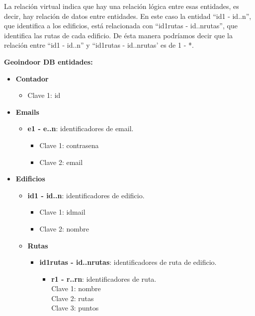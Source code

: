 La relación virtual indica que hay una relación lógica entre esas entidades, es decir, hay relación de datos entre entidades. En este caso la entidad ``id1 - id..n'', que identifica a los edificios, está relacionada con ``id1rutas - id..nrutas'', que identifica las rutas de cada edificio. De ésta manera podríamos decir que la relación entre ``id1 - id..n'' y ``id1rutas - id..nrutas' es de 1 - *.

\newpage
\textbf{ Geoindoor DB entidades:}
\begin{itemize}
	\item \textbf{Contador}
	\begin{itemize}
		\item Clave 1: id
	\end{itemize}
	\item \textbf{Emails}
	\begin{itemize}
		\item \textbf{e1 - e..n}: identificadores de email.
		\begin{itemize}
			\item Clave 1: contrasena
			\item Clave 2: email 
		\end{itemize}
	\end{itemize}
	\item \textbf{Edificios}
	\begin{itemize}
		\item \textbf{id1 - id..n}: identificadores de edificio.
		\begin{itemize}
			\item Clave 1: idmail 
			\item Clave 2: nombre
		\end{itemize}
		\item \textbf{Rutas}
		\begin{itemize}
			\item \textbf{id1rutas - id..nrutas}: identificadores de ruta de edificio.
			\begin{itemize}
				\item \textbf{r1 - r..rn}: identificadores de ruta. \\
				\hspace{0.5cm} Clave 1: nombre \\
				\hspace{0.5cm} Clave 2: rutas\\
				\hspace{0.5cm} Clave 3: puntos \\
			\end{itemize}
		\end{itemize}
	\end{itemize}
\end{itemize}




